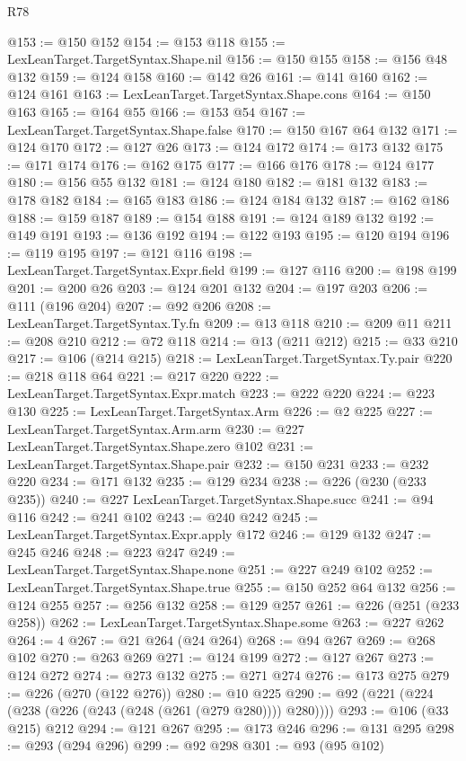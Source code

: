 \begin{lexlean}{R78}
\begin{coremodule}
@153 := @150 @152
@154 := @153 @118
@155 := LexLeanTarget.TargetSyntax.Shape.nil
@156 := @150 @155
@158 := @156 @48 @132
@159 := @124 @158
@160 := @142 @26
@161 := @141 @160
@162 := @124 @161
@163 := LexLeanTarget.TargetSyntax.Shape.cons
@164 := @150 @163
@165 := @164 @55
@166 := @153 @54
@167 := LexLeanTarget.TargetSyntax.Shape.false
@170 := @150 @167 @64 @132
@171 := @124 @170
@172 := @127 @26
@173 := @124 @172
@174 := @173 @132
@175 := @171 @174
@176 := @162 @175
@177 := @166 @176
@178 := @124 @177
@180 := @156 @55 @132
@181 := @124 @180
@182 := @181 @132
@183 := @178 @182
@184 := @165 @183
@186 := @124 @184 @132
@187 := @162 @186
@188 := @159 @187
@189 := @154 @188
@191 := @124 @189 @132
@192 := @149 @191
@193 := @136 @192
@194 := @122 @193
@195 := @120 @194
@196 := @119 @195
@197 := @121 @116
@198 := LexLeanTarget.TargetSyntax.Expr.field
@199 := @127 @116
@200 := @198 @199
@201 := @200 @26
@203 := @124 @201 @132
@204 := @197 @203
@206 := @111 (@196 @204)
@207 := @92 @206
@208 := LexLeanTarget.TargetSyntax.Ty.fn
@209 := @13 @118
@210 := @209 @11
@211 := @208 @210
@212 := @72 @118
@214 := @13 (@211 @212)
@215 := @33 @210
@217 := @106 (@214 @215)
@218 := LexLeanTarget.TargetSyntax.Ty.pair
@220 := @218 @118 @64
@221 := @217 @220
@222 := LexLeanTarget.TargetSyntax.Expr.match
@223 := @222 @220
@224 := @223 @130
@225 := LexLeanTarget.TargetSyntax.Arm
@226 := @2 @225
@227 := LexLeanTarget.TargetSyntax.Arm.arm
@230 := @227 LexLeanTarget.TargetSyntax.Shape.zero @102
@231 := LexLeanTarget.TargetSyntax.Shape.pair
@232 := @150 @231
@233 := @232 @220
@234 := @171 @132
@235 := @129 @234
@238 := @226 (@230 (@233 @235))
@240 := @227 LexLeanTarget.TargetSyntax.Shape.succ
@241 := @94 @116
@242 := @241 @102
@243 := @240 @242
@245 := LexLeanTarget.TargetSyntax.Expr.apply @172
@246 := @129 @132
@247 := @245 @246
@248 := @223 @247
@249 := LexLeanTarget.TargetSyntax.Shape.none
@251 := @227 @249 @102
@252 := LexLeanTarget.TargetSyntax.Shape.true
@255 := @150 @252 @64 @132
@256 := @124 @255
@257 := @256 @132
@258 := @129 @257
@261 := @226 (@251 (@233 @258))
@262 := LexLeanTarget.TargetSyntax.Shape.some
@263 := @227 @262
@264 := 4
@267 := @21 @264 (@24 @264)
@268 := @94 @267
@269 := @268 @102
@270 := @263 @269
@271 := @124 @199
@272 := @127 @267
@273 := @124 @272
@274 := @273 @132
@275 := @271 @274
@276 := @173 @275
@279 := @226 (@270 (@122 @276))
@280 := @10 @225
@290 := @92 (@221 (@224 (@238 (@226 (@243 (@248 (@261 (@279 @280)))) @280))))
@293 := @106 (@33 @215) @212
@294 := @121 @267
@295 := @173 @246
@296 := @131 @295
@298 := @293 (@294 @296)
@299 := @92 @298
@301 := @93 (@95 @102)

\end{coremodule}
\end{lexlean}
